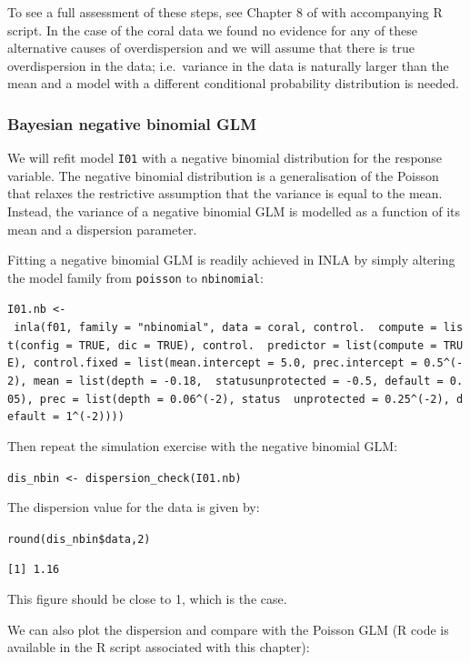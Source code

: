 \documentclass[
]{book}
\begin{document}
To see a full assessment of these steps, see Chapter 8 of \citep{Smith_etal_2020} with accompanying R script. In the case of the coral data we found no evidence for any of these alternative causes of overdispersion and we will assume that there is true overdispersion in the data; i.e.~variance in the data is naturally larger than the mean and a model with a different conditional probability distribution is needed.

\hypertarget{nbglm-fit}{%
\subsubsection{Bayesian negative binomial GLM}\label{nbglm-fit}}

We will refit model \texttt{I01} with a negative binomial distribution for the response variable. The negative binomial distribution is a generalisation of the Poisson that relaxes the restrictive assumption that the variance is equal to the mean. Instead, the variance of a negative binomial GLM is modelled as a function of its mean and a dispersion parameter.

Fitting a negative binomial GLM is readily achieved in INLA by simply altering the model family from \texttt{poisson} to \texttt{nbinomial}:

\texttt{I01.nb\ \textless{}-\ inla(f01,\ family\ =\ "nbinomial",\ data\ =\ coral,\ control.\ \ compute\ =\ list(config\ =\ TRUE,\ dic\ =\ TRUE),\ control.\ \ predictor\ =\ list(compute\ =\ TRUE),\ control.fixed\ =\ list(mean.intercept\ =\ 5.0,\ prec.intercept\ =\ 0.5\^{}(-2),\ mean\ =\ list(depth\ =\ -0.18,\ \ statusunprotected\ =\ -0.5,\ default\ =\ 0.05),\ prec\ =\ list(depth\ =\ 0.06\^{}(-2),\ status\ \ unprotected\ =\ 0.25\^{}(-2),\ default\ =\ 1\^{}(-2))))}

Then repeat the simulation exercise with the negative binomial GLM:

\texttt{dis\_nbin\ \textless{}-\ dispersion\_check(I01.nb)}

The dispersion value for the data is given by:

\texttt{round(dis\_nbin\$data,2)}

\begin{verbatim}
[1] 1.16
\end{verbatim}

This figure should be close to 1, which is the case.

We can also plot the dispersion and compare with the Poisson GLM (R code is available in the R script associated with this chapter):
\end{document}
